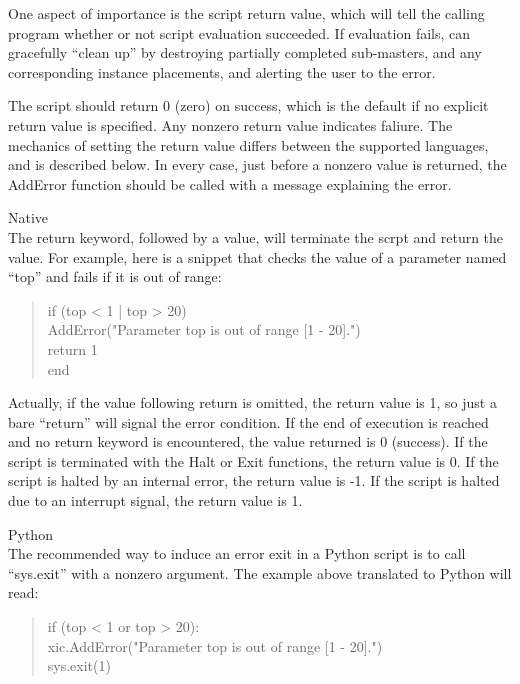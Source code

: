 One aspect of importance is the script return value, which will tell
the calling program whether or not script evaluation succeeded.  If
evaluation fails, {\Xic} can gracefully ``clean up'' by destroying
partially completed sub-masters, and any corresponding instance
placements, and alerting the user to the error.

The script should return 0 (zero) on success, which is the default if
no explicit return value is specified.  Any nonzero return value
indicates faliure.  The mechanics of setting the return value differs
between the supported languages, and is described below.  In every
case, just before a nonzero value is returned, the {\vt AddError}
function should be called with a message explaining the error.

\begin{description}
\item{Native}\\
The {\vt return} keyword, followed by a value, will terminate the scrpt
and return the value.  For example, here is a snippet that checks the
value of a parameter named ``{\vt top}'' and fails if it is out of range:
\begin{quote} \vt
if (top < 1 | top > 20)\\
\hspace*{5mm}AddError("Parameter top is out of range [1 - 20].")\\
\hspace*{5mm}return 1\\
end
\end{quote}

Actually, if the value following {\vt return} is omitted, the return
value is 1, so just a bare ``{\vt return}'' will signal the error
condition.  If the end of execution is reached and no {\vt return}
keyword is encountered, the value returned is 0 (success).  If the
script is terminated with the {\vt Halt} or {\vt Exit} functions, the
return value is 0.  If the script is halted by an internal error, the
return value is -1.  If the script is halted due to an interrupt
signal, the return value is 1.

\item{Python}\\
The recommended way to induce an error exit in a Python script is to
call ``{\vt sys.exit}'' with a nonzero argument.  The example above
translated to Python will read:
\begin{quote} \vt
if (top < 1 or top > 20):\\
\hspace*{5mm}xic.AddError("Parameter top is out of range [1 - 20].")\\
\hspace*{5mm}sys.exit(1)
\end{quote}


\end{description}
